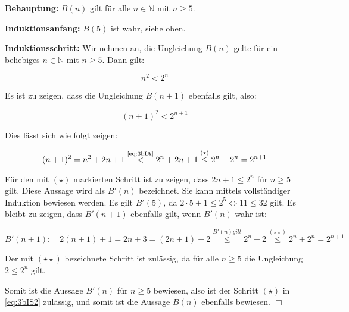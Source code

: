 \documentclass[a4paper,10pt]{scrartcl}
\begin{document}
\begin{enumerate}
\begin{enumerate}
                \textbf{Behauptung:} $B(n)$ gilt für alle $n \in \mathbb{N}$ mit $n \geq 5$.

                \textbf{Induktionsanfang:} $B(5)$ ist wahr, siehe oben.

                \textbf{Induktionsschritt:} Wir nehmen an, die Ungleichung $B(n)$ gelte für ein beliebiges $n \in \mathbb{N}$ mit $n \geq 5$. Dann gilt:

                \begin{equation}\label{eq:3bIA}\tag{IA}
                    n^2 < 2^n
                \end{equation}

                Es ist zu zeigen, dass die Ungleichung $B(n + 1)$ ebenfalls gilt, also:

                \begin{equation}\label{eq:3bIS1}
                    (n+1)^2 < 2^{n+1}
                \end{equation}

                Dies lässt sich wie folgt zeigen:

                \begin{equation}\label{eq:3bIS2}
                    (n+1)^2 = n^2 + 2n + 1 \overset{\text{\scriptsize\eqref{eq:3bIA}}}{<} 2^n + 2n + 1 \overset{(\star)}{\leq} 2^n + 2^n = 2^{n+1}
                \end{equation}

                Für den mit $(\star)$ markierten Schritt ist zu zeigen, dass $2n + 1 \leq 2^n$ für $n \geq 5$ gilt. Diese Aussage wird
                als $B'(n)$ bezeichnet. Sie kann mittels vollständiger Induktion bewiesen werden. Es gilt $B'(5)$, da
                $2 \cdot 5 + 1 \leq 2^5 \Leftrightarrow 11 \leq 32$ gilt. Es bleibt zu zeigen, dass $B'(n+1)$ ebenfalls gilt, wenn $B'(n)$
                wahr ist:

                \begin{equation}\label{eq:3bIS3}
                    B'(n + 1): \hspace{1em}
                    2(n + 1) + 1 = 2n + 3 = (2n + 1) + 2 \overset{B'(n) gilt}{\leq} 2^n + 2 \overset{(\star\star)}{\leq} 2^n + 2^n = 2^{n+1}
                \end{equation}

                Der mit $(\star\star)$ bezeichnete Schritt ist zulässig, da für alle $n \geq 5$ die Ungleichung $2 \leq 2^n$ gilt.

                Somit ist die Aussage $B'(n)$ für $n \geq 5$ bewiesen, also ist der Schritt $(\star)$ in \eqref{eq:3bIS2}
                zulässig, und somit ist die Aussage $B(n)$ ebenfalls bewiesen. $\Box$


\end{enumerate}
\end{enumerate}
\end{document}
